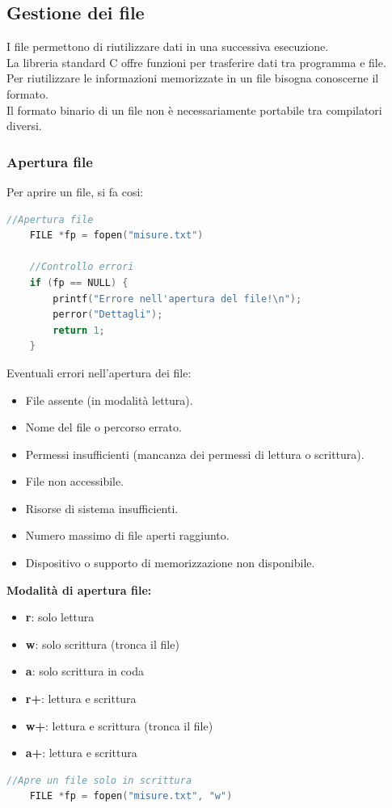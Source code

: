 \documentclass[12pt,a4paper]{article}
\begin{document}
\subsection{Gestione dei file}
I file permettono di riutilizzare dati in una successiva esecuzione.\\
La libreria standard C offre funzioni per trasferire dati tra programma e file.\\
Per riutilizzare le informazioni memorizzate in un file bisogna conoscerne il formato.\\
Il formato binario di un file non è necessariamente portabile tra compilatori diversi.\\
\subsubsection{Apertura file}
Per aprire un file, si fa cosi:
\begin{lstlisting}[language=C]
    //Apertura file
    FILE *fp = fopen("misure.txt")

    //Controllo errori
    if (fp == NULL) {
        printf("Errore nell'apertura del file!\n");
        perror("Dettagli");
        return 1;
    }
\end{lstlisting}
Eventuali errori nell'apertura dei file:
\begin{itemize}
    \item File assente (in modalità lettura).
    \item Nome del file o percorso errato.
    \item Permessi insufficienti (mancanza dei
    permessi di lettura o scrittura).
    \item File non accessibile.
    \item Risorse di sistema insufficienti.
    \item Numero massimo di file aperti raggiunto.
    \item Dispositivo o supporto di memorizzazione
    non disponibile.
\end{itemize}
\textbf{Modalità di apertura file:}
\begin{itemize}
    \item \textbf{r}: solo lettura
    \item \textbf{w}: solo scrittura (tronca il file)
    \item \textbf{a}: solo scrittura in coda
    \item \textbf{r+}: lettura e scrittura
    \item \textbf{w+}: lettura e scrittura (tronca il file)
    \item \textbf{a+}: lettura e scrittura
\end{itemize}
\begin{lstlisting}[language=C]
    //Apre un file solo in scrittura
    FILE *fp = fopen("misure.txt", "w")
\end{lstlisting}
\end{document}
